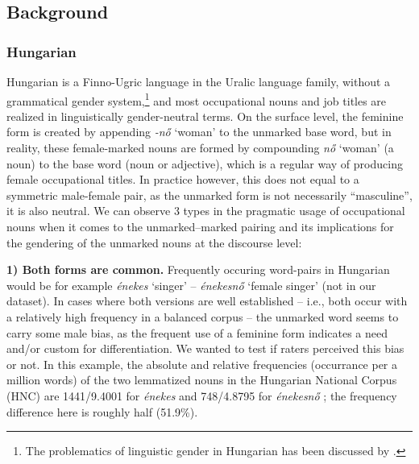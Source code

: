 \documentclass[11pt]{article}
\begin{document}
\subsection{Background}

\subsubsection{Hungarian}

Hungarian is a Finno-Ugric language in the Uralic language family, without a grammatical gender system,\footnote{The problematics of linguistic gender in Hungarian has been discussed by \citet{vasvari_2014_problemas}.} and most occupational nouns and job titles are realized in linguistically gender-neutral terms. 
On the surface level, the feminine form is created by appending \textit{-nő} `woman' to the unmarked base word, but in reality, these female-marked nouns are formed by compounding \textit{nő} `woman' (a noun) to the base word (noun or adjective), which is a regular way of producing female occupational titles. In practice however, this does not equal to a symmetric male-female pair, as the unmarked form is not necessarily ``masculine'', it is also neutral. We can observe 3 types in the pragmatic usage of occupational nouns when it comes to the unmarked--marked pairing and its implications for the gendering of the unmarked nouns at the discourse level:

\textbf{1) Both forms are common.} Frequently occuring word-pairs in Hungarian would be for example \textit{énekes} `singer' -- \textit{énekesnő} `female singer' (not in our dataset). In cases where both versions are well established -- i.e., both occur with a relatively high frequency in a balanced corpus -- the unmarked word seems to carry some male bias, as the frequent use of a feminine form indicates a need and/or custom for differentiation. We wanted to test if raters perceived this bias or not. In this example, the absolute and relative frequencies (occurrance per a million words) of the two lemmatized nouns in the Hungarian National Corpus (HNC) are 1441/9.4001 for \textit{énekes} and 748/4.8795 for \textit{énekesnő} \citep{varadi_2002_hungarian, oravecz_2014_hungarian}; the frequency difference here is roughly half (51.9\%).
\end{document}
